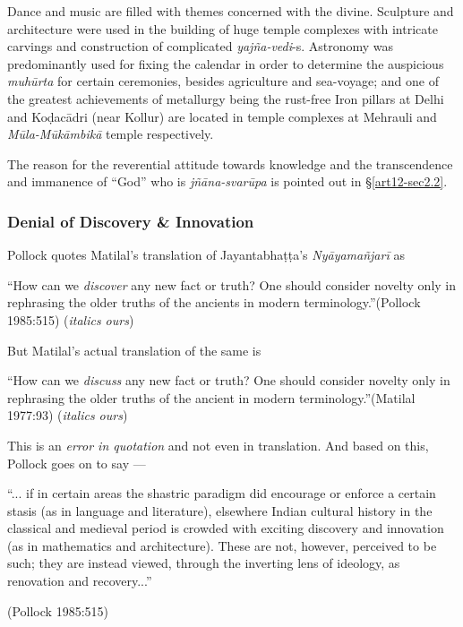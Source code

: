 Dance and music are ﬁlled with themes concerned with the divine. Sculpture and architecture were used in the building of huge temple complexes with intricate carvings and construction of complicated {\sl yajña-vedi}-s. Astronomy was predominantly used for ﬁxing the calendar in order to determine the auspicious {\sl muhūrta} for certain ceremonies, besides agriculture and sea-voyage; and one of the greatest achievements of metallurgy being the rust-free Iron pillars at Delhi and Koḍacādri (near Kollur) are located in temple complexes at Mehrauli and {\sl Mūla-Mūkāmbikā} temple respectively. 

The reason for the reverential attitude towards knowledge and the transcendence and immanence of ``God'' who is {\sl jñāna-svarūpa} is pointed out in \S\ref{art12-sec2.2}.\\[-20pt]

\subsubsection{Denial of Discovery \& Innovation}\label{art12-sec3.8.2}

Pollock quotes Matilal's translation of Jayantabhaṭṭa's {\sl Nyāyamañjarī} as
\begin{myquote}
``How can we {\sl discover} any new fact or truth? One should consider novelty only in rephrasing the older truths of the ancients in modern terminology.''\hfill (Pollock 1985:515) ({\sl italics ours})
\end{myquote}

But Matilal's actual translation of the same is

\begin{myquote}
``How can we {\sl discuss} any new fact or truth? One should consider novelty only in rephrasing the older truths of the ancient in modern terminology.''\hfill (Matilal 1977:93) ({\sl italics ours})
\end{myquote}

This is an {\sl error in quotation}  and not even in translation. And based on this, Pollock goes on to say ---
\begin{myquote}
``... if in certain areas the shastric paradigm did encourage or enforce a certain stasis (as in language and literature), elsewhere Indian cultural history in the classical and medieval period is crowded with exciting discovery and innovation (as in mathematics and architecture). These are not, however, perceived to be such; they are instead viewed, through the inverting lens of ideology, as renovation and recovery...'' 

\hfill (Pollock 1985:515)
\end{myquote}



